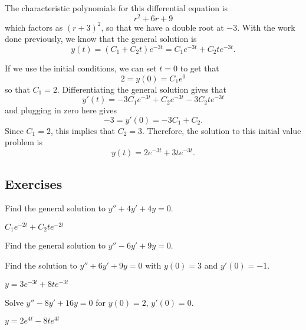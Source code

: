 \begin{exampleSol}
The characteristic polynomials for this differential equation is 
\begin{equation*}
r^2 + 6r + 9
\end{equation*}
which factors as $(r+3)^2$, so that we have a double root at $-3$. With the work done previously, we know that the general solution is
\begin{equation*}
y(t) = (C_1 + C_2t)e^{-3t} = C_1e^{-3t} + C_2te^{-3t}.
\end{equation*} 

If we use the initial conditions, we can set $t=0$ to get that
\begin{equation*}
2 = y(0) = C_1 e^0
\end{equation*}
so that $C_1 = 2$. Differentiating the general solution gives that
\begin{equation*}
y'(t) = -3C_1e^{-3t} + C_2e^{-3t} -3C_2te^{-3t}
\end{equation*}
and plugging in zero here gives
\begin{equation*}
-3 = y'(0) = -3C_1 + C_2.
\end{equation*}
Since $C_1 = 2$, this implies that $C_2 = 3$. Therefore, the solution to this initial value problem is
\begin{equation*}
y(t) = 2e^{-3t} + 3te^{-3t}.
\end{equation*}
\end{exampleSol}

\subsection{Exercises}

\begin{exercise}
Find the general solution to $y'' + 4y' + 4y = 0$.
\end{exercise}
\comboSol{%
}
{%
$C_1e^{-2t} + C_2te^{-2t}$
}

\begin{exercise}\ansMark%
Find the general solution to
$y''-6y'+9y=0$.
\end{exercise}


\begin{exercise}
Find the solution to $y'' + 6y' + 9y = 0$ with $y(0) = 3$ and $y'(0) = -1$. 
\end{exercise}
\comboSol{%
}
{%
$y = 3e^{-3t} + 8te^{-3t}$
}

\begin{exercise}
Solve $y'' - 8y' + 16 y = 0$ for $y(0) = 2$, $y'(0) = 0$.
\end{exercise}
\comboSol{%
}
{%
$y = 2e^{4t} - 8te^{4t}$
}

